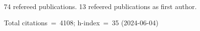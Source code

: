 74 refereed publications. 13 refeered publications as first author.

Total citations~=~4108; h-index~=~35 (2024-06-04)